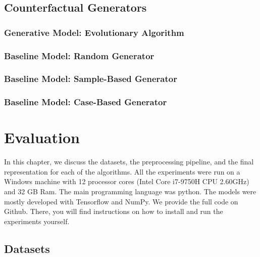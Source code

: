 \documentclass[12pt,a4paper]{report}
\begin{document}
\section{Counterfactual Generators}
\label{sec:model_generation}
\subsection{Generative Model: Evolutionary Algorithm}
\label{sec:model_evolutionary}


\subsection{Baseline Model: Random Generator}


\subsection{Baseline Model: Sample-Based Generator}


\subsection{Baseline Model: Case-Based Generator}



\chapter{Evaluation}
\label{ch:evaluation}
In this chapter, we discuss the datasets, the preprocessing pipeline, and the final representation for each of the algorithms. All the experiments were run on a Windows machine with 12 processor cores (Intel Core i7-9750H CPU 2.60GHz) and 32 GB Ram. The main programming language was python. 
The models were mostly developed with Tensorflow\autocite{abadi2016tensorflow} and NumPy\autocite{2020NumPy-Array}. 
We provide the full code on Github\autocite{hundogan_ThesisProjectCode_2022}. 
There, you will find instructions on how to install and run the experiments yourself.


\section{Datasets}
\label{sec:dataset_description}

% 
% 
\end{document}
